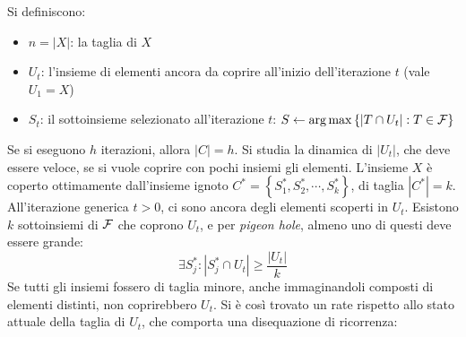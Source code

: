 Si definiscono:
\begin{itemize}[noitemsep,parsep=0pt,partopsep=0pt,topsep=0pt]
    \item $n = |X|$: la taglia di $X$
    \item $U_t$:
        l'insieme di elementi ancora da coprire all'inizio dell'iterazione $t$
        (vale $U_1 = X$)
    \item $S_t$:
        il sottoinsieme selezionato all'iterazione $t$:
        $S \gets \operatorname*{arg\,max} \left\{ | T \cap U_t | : T \in \mathcal{F} \right\}$
\end{itemize}
Se si eseguono $h$ iterazioni, allora $|C|=h$.
Si studia la dinamica di $|U_t|$, che deve essere veloce, se si vuole coprire con pochi insiemi gli elementi.
L'insieme $X$ è coperto ottimamente dall'insieme ignoto $
C^* = \left\{
    S_1^*,
    S_2^*,
    \cdots,
    S_k^*
\right\}
$, di taglia $|C^*|=k$.
All'iterazione generica $t>0$, ci sono ancora degli elementi scoperti in $U_t$.
Esistono $k$ sottoinsiemi di $\mathcal{F}$ che coprono $U_t$, e per \emph{pigeon hole}, almeno uno di questi deve essere grande:
\begin{equation*}
    \exists S_j^* :
    | S_j^* \cap U_t | \geq \frac{|U_t|}{k}
\end{equation*}
Se tutti gli insiemi fossero di taglia minore, anche immaginandoli composti di elementi distinti, non coprirebbero $U_t$.
Si è così trovato un rate rispetto allo stato attuale della taglia di $U_t$, che comporta una disequazione di ricorrenza:
